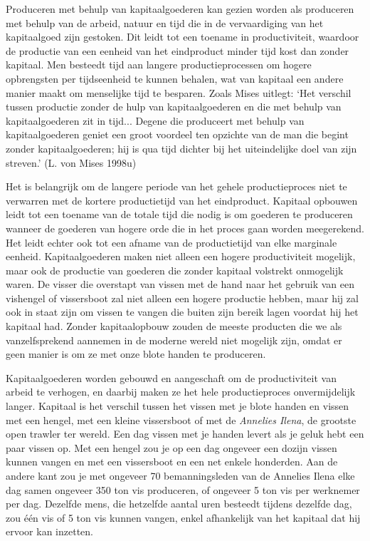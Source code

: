 \documentclass[
  a5paper,
  smalldemyvopaper,11pt,twoside,onecolumn,openright,extrafontsizes,
hidelinks]{memoir}
\begin{document}
Produceren met behulp van kapitaalgoederen kan gezien worden als
produceren met behulp van de arbeid, natuur en tijd die in de
vervaardiging van het kapitaalgoed zijn gestoken. Dit leidt tot een
toename in productiviteit, waardoor de productie van een eenheid van het
eindproduct minder tijd kost dan zonder kapitaal. Men besteedt tijd aan
langere productieprocessen om hogere opbrengsten per tijdseenheid te
kunnen behalen, wat van kapitaal een andere manier maakt om menselijke
tijd te besparen. Zoals Mises uitlegt: `Het verschil tussen productie
zonder de hulp van kapitaalgoederen en die met behulp van
kapitaalgoederen zit in tijd... Degene die produceert met behulp van
kapitaalgoederen geniet een groot voordeel ten opzichte van de man die
begint zonder kapitaalgoederen; hij is qua tijd dichter bij het
uiteindelijke doel van zijn streven.' (L. von Mises 1998u)

Het is belangrijk om de langere periode van het gehele productieproces
niet te verwarren met de kortere productietijd van het eindproduct.
Kapitaal opbouwen leidt tot een toename van de totale tijd die nodig is
om goederen te produceren wanneer de goederen van hogere orde die in het
proces gaan worden meegerekend. Het leidt echter ook tot een afname van
de productietijd van elke marginale eenheid. Kapitaalgoederen maken niet
alleen een hogere productiviteit mogelijk, maar ook de productie van
goederen die zonder kapitaal volstrekt onmogelijk waren. De visser die
overstapt van vissen met de hand naar het gebruik van een vishengel of
vissersboot zal niet alleen een hogere productie hebben, maar hij zal
ook in staat zijn om vissen te vangen die buiten zijn bereik lagen
voordat hij het kapitaal had. Zonder kapitaalopbouw zouden de meeste
producten die we als vanzelfsprekend aannemen in de moderne wereld niet
mogelijk zijn, omdat er geen manier is om ze met onze blote handen te
produceren.

Kapitaalgoederen worden gebouwd en aangeschaft om de productiviteit van
arbeid te verhogen, en daarbij maken ze het hele productieproces
onvermijdelijk langer. Kapitaal is het verschil tussen het vissen met je
blote handen en vissen met een hengel, met een kleine vissersboot of met
de \emph{Annelies Ilena}, de grootste open trawler ter wereld. Een dag
vissen met je handen levert als je geluk hebt een paar vissen op. Met
een hengel zou je op een dag ongeveer een dozijn vissen kunnen vangen en
met een vissersboot en een net enkele honderden. Aan de andere kant zou
je met ongeveer 70 bemanningsleden van de Annelies Ilena elke dag samen
ongeveer 350 ton vis produceren, of ongeveer 5 ton vis per werknemer per
dag. Dezelfde mens, die hetzelfde aantal uren besteedt tijdens dezelfde
dag, zou één vis of 5 ton vis kunnen vangen, enkel afhankelijk van het
kapitaal dat hij ervoor kan inzetten.
\end{document}
